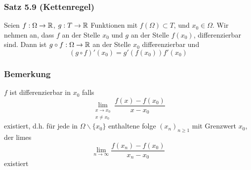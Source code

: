 \subsubsection*{Satz 5.9 (Kettenregel)}
Seien $f:\Omega\to\mathbb{R}$, $g:T\to\mathbb{R}$ Funktionen mit $f\left( \Omega\right)\subset T$, und $x_0\in\Omega$. Wir nehmen an, dass $f$ an der Stelle $x_0$ und $g$ an der Stelle $f\left( x_0\right)$, differenzierbar sind. Dann ist $g\circ f:\Omega\to\mathbb{R}$ an der Stelle $x_0$ differenzierbar und 
\[\left( {g\circ f} \right)'\left( {{x_0}} \right) = g'\left( {f\left( {{x_0}} \right)} \right)f'\left( {{x_0}} \right)\]

\subsubsection*{Bemerkung}
$f$ ist differenzierbar in $x_0$ falls 
\[\mathop {\lim }\limits_{\begin{array}{*{20}{c}}
{x \to {x_0}}\\
{x\not  = {x_0}}
\end{array}} \frac{{f\left( x \right) - f\left( {{x_0}} \right)}}{{x - {x_0}}}\]
existiert, d.h. für jede in $\Omega\backslash\{ x_0\}$ enthaltene folge $\left( x_n\right)_{n\geq 1}$ mit Grenzwert $x_0$, der limes 
\[\mathop {\lim }\limits_{n \to \infty } \frac{{f\left( {{x_n}} \right) - f\left( {{x_0}} \right)}}{{{x_n} - {x_0}}}\] existiert

